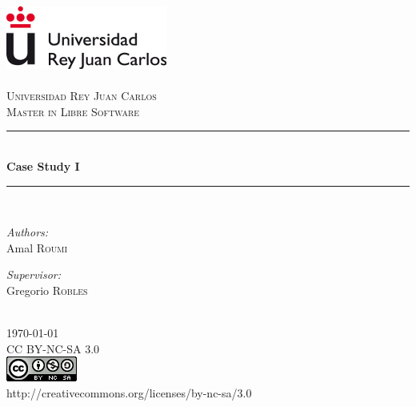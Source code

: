 \documentclass[11pt]{article} %
\begin{document}
\begin{titlepage}
\newcommand{\HRule}{\rule{\linewidth}{0.5mm}} %
\center %
\includegraphics{urjc} \\[0.5cm] %
\textsc{\LARGE \\Universidad Rey Juan Carlos}\\[1cm] %
\textsc{\Large Master in Libre Software}\\[0.5cm] %
\HRule \\[1.5cm]
{ \huge \bfseries Case Study I}\\[0.4cm] %
\HRule \\[1.5cm]
\begin{minipage}{0.4\textwidth}
\begin{flushleft} \large
\emph{Authors:}\\
Amal \textsc{Roumi}\\ %
\end{flushleft}
\end{minipage}
\begin{minipage}{0.4\textwidth}
\begin{flushright} \large
\emph{Supervisor:} \\
Gregorio  \textsc{Robles} %
\end{flushright}
\end{minipage}\\[1.5cm]
{\large \today}\\[1.8cm] %
\textsc CC BY-NC-SA 3.0\\[0.2cm]
\includegraphics[scale=0.5]{license} \\ %
{\small http://creativecommons.org/licenses/by-nc-sa/3.0}\\
\mbox{}

\end{titlepage}
\end{document}
